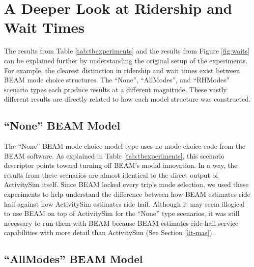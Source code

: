 \documentclass[12pt, oneside, openright]{byuthesis}
\begin{document}
\hypertarget{deep-look}{%
\section{A Deeper Look at Ridership and Wait Times}\label{deep-look}}

The results from Table \ref{tab:tbexperiments} and the results from Figure \ref{fig:waits} can be explained further by understanding the original setup of the experiments. For example, the clearest distinction in ridership and wait times exist between BEAM mode choice structures. The ``None'', ``AllModes'', and ``RHModes'' scenario types each produce results at a different magnitude. These vastly different results are directly related to how each model structure was constructed.

\hypertarget{none-beam-model}{%
\subsection{``None'' BEAM Model}\label{none-beam-model}}

The ``None'' BEAM mode choice model type uses no mode choice code from the BEAM software. As explained in Table \ref{tab:tbexperiments}, this scenario descriptor points toward turning off BEAM's modal innovation. In a way, the results from these scenarios are almost identical to the direct output of ActivitySim itself. Since BEAM locked every trip's mode selection, we used these experiments to help understand the difference between how BEAM estimates ride hail against how ActivitySim estimates ride hail. Although it may seem illogical to use BEAM on top of ActivitySim for the ``None'' type scenarios, it was still necessary to run them with BEAM because BEAM estimates ride hail service capabilities with more detail than ActivitySim (See Section \ref{lit-mas}).

\hypertarget{allmodes-beam-model}{%
\subsection{``AllModes'' BEAM Model}\label{allmodes-beam-model}}
\end{document}
